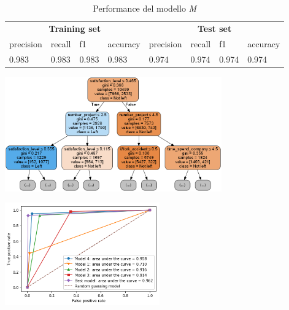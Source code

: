 \documentclass[a4paper]{article}
\begin{document}
\begin{table}[h]
\centering
\begingroup
\setlength{\tabcolsep}{10pt} %
\renewcommand{\arraystretch}{1.5} %

\begin{tabularx}{\textwidth}{|XXXX|XXXX|}
\hline
          \multicolumn{4}{|c|}{\textbf{Training set}} & \multicolumn{4}{c|}{\textbf{Test set}} \\
          precision  & recall  & f1     & accuracy  & precision & recall & f1    & accuracy \\
 0.983      & 0.983   & 0.983  & 0.983     & 0.974     & 0.974  & 0.974 & 0.974    \\
\hline
\end{tabularx}
\endgroup
\caption{Performance del modello \textit{M}}
\label{tab:performancesOfBestModel}
\end{table}

\begin{center}
\includegraphics[width=0.7\textwidth]{best_model_representation}
\label{fig:best_model_representation}

\includegraphics[width=0.5\textwidth]{roc_curves}
\label{fig:roc_curves_all_models}

\end{center}

%
%
%    
%    
\end{document}
